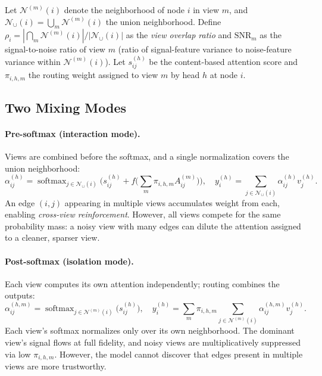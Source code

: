 \documentclass[11pt,a4paper]{article}
\newcommand{\calN}{\mathcal{N}}
\DeclareMathOperator{\softmax}{softmax}
\begin{document}
Let $\calN^{(m)}(i)$ denote the neighborhood of node $i$ in view $m$,
and $\calN_\cup(i) = \bigcup_m \calN^{(m)}(i)$ the union neighborhood.
Define $\rho_i = |\bigcap_m \calN^{(m)}(i)| / |\calN_\cup(i)|$ as the
\emph{view overlap ratio} and $\mathrm{SNR}_m$ as the signal-to-noise
ratio of view $m$ (ratio of signal-feature variance to noise-feature
variance within $\calN^{(m)}(i)$).
Let $s_{ij}^{(h)}$ be the content-based attention score and
$\pi_{i,h,m}$ the routing weight assigned to view $m$ by head $h$ at
node $i$.

\subsection{Two Mixing Modes}
\label{sec:two_modes}

\paragraph{Pre-softmax (interaction mode).}
Views are combined before the softmax, and a single normalization
covers the union neighborhood:
\begin{equation}
  \label{eq:pre_general}
  \alpha_{ij}^{(h)} = \softmax_{j \in \calN_\cup(i)}\!\Big(
    s_{ij}^{(h)} + f\!\big(\textstyle\sum_m \pi_{i,h,m} A_{ij}^{(m)}\big)
  \Big),
  \quad
  y_i^{(h)} = \sum_{j \in \calN_\cup(i)} \alpha_{ij}^{(h)} v_j^{(h)}.
\end{equation}
An edge $(i,j)$ appearing in multiple views accumulates weight from
each, enabling \emph{cross-view reinforcement}.
However, all views compete for the same probability mass: a noisy view
with many edges can dilute the attention assigned to a cleaner, sparser
view.

\paragraph{Post-softmax (isolation mode).}
Each view computes its own attention independently; routing combines
the outputs:
\begin{equation}
  \label{eq:post_general}
  \alpha_{ij}^{(h,m)} = \softmax_{j \in \calN^{(m)}(i)}\!
    \big(s_{ij}^{(h)}\big),
  \quad
  y_i^{(h)} = \sum_m \pi_{i,h,m}
    \sum_{j \in \calN^{(m)}(i)} \alpha_{ij}^{(h,m)} v_j^{(h)}.
\end{equation}
Each view's softmax normalizes only over its own neighborhood.
The dominant view's signal flows at full fidelity, and noisy views are
multiplicatively suppressed via low $\pi_{i,h,m}$.
However, the model cannot discover that edges present in multiple views
are more trustworthy.
\end{document}
